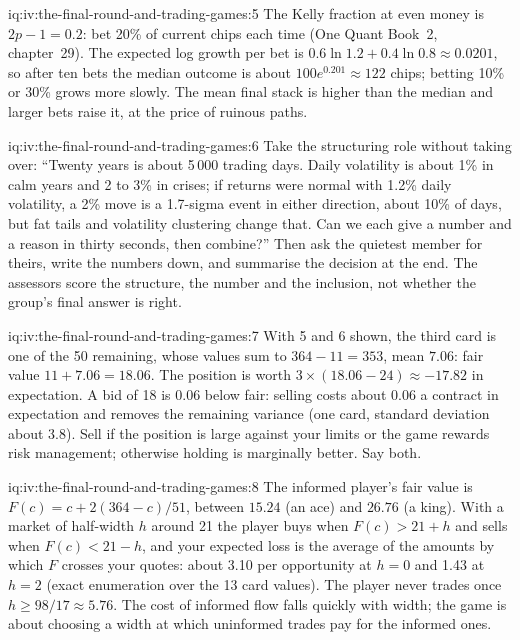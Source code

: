 \begin{solution}{iq:iv:the-final-round-and-trading-games:5}
The Kelly fraction at even money is $2p - 1 = 0.2$: bet 20\% of current chips each time (One Quant Book~2,
chapter~29). The expected log growth per bet is $0.6\ln 1.2 + 0.4\ln 0.8 \approx 0.0201$, so after ten bets
the median outcome is about $100e^{0.201} \approx 122$ chips; betting 10\% or 30\% grows more slowly. The mean
final stack is higher than the median and larger bets raise it, at the price of ruinous paths.
\end{solution}

\begin{solution}{iq:iv:the-final-round-and-trading-games:6}
Take the structuring role without taking over: ``Twenty years is about 5\,000 trading days. Daily volatility
is about 1\% in calm years and 2 to 3\% in crises; if returns were normal with 1.2\% daily volatility, a 2\% move
is a 1.7-sigma event in either direction, about 10\% of days, but fat tails and volatility clustering change that. Can we each
give a number and a reason in thirty seconds, then combine?'' Then ask the quietest member for theirs, write
the numbers down, and summarise the decision at the end. The assessors score the structure, the number and the
inclusion, not whether the group's final answer is right.
\end{solution}

\begin{solution}{iq:iv:the-final-round-and-trading-games:7}
With 5 and 6 shown, the third card is one of the 50 remaining, whose values sum to $364 - 11 = 353$, mean
$7.06$: fair value $11 + 7.06 = 18.06$. The position is worth $3 \times (18.06 - 24) \approx -17.82$ in
expectation. A bid of 18 is 0.06 below fair: selling costs about 0.06 a contract in expectation and removes the
remaining variance (one card, standard deviation about 3.8). Sell if the position is large against your
limits or the game rewards risk management; otherwise holding is marginally better. Say both.
\end{solution}

\begin{solution}{iq:iv:the-final-round-and-trading-games:8}
The informed player's fair value is $F(c) = c + 2(364 - c)/51$, between $15.24$ (an ace) and $26.76$ (a king).
With a market of half-width $h$ around 21 the player buys when $F(c) > 21 + h$ and sells when $F(c) < 21 -
h$, and your expected loss is the average of the amounts by which $F$ crosses your quotes: about 3.10 per
opportunity at $h = 0$ and 1.43 at $h = 2$ (exact enumeration over the 13 card values). The player never
trades once $h \ge 98/17 \approx 5.76$. The cost of informed flow falls quickly with width; the game is about
choosing a width at which uninformed trades pay for the informed ones.
\end{solution}

